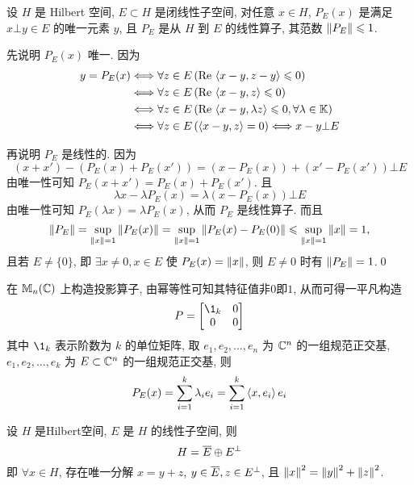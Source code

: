 		\begin{Theorem}[投影线性算子]
			 设 $ H $ 是 Hilbert 空间, $ E\subset H $ 是闭线性子空间,  对任意 $ x\in H $, $ P_{E}(x) $ 是满足 $ x\bot y\in E $ 的唯一元素 $ y $, 且 $ P_{E} $ 是从 $ H $ 到 $ E $ 的线性算子, 其范数 $ \norm{P_{E}}\leqslant1 $.
		\end{Theorem}
			
		\begin{Proof}
			先说明 $ P_{E}(x) $ 唯一. 因为
			\[
				\begin{aligned}
					y=P_{E}(x) & \Longleftrightarrow \forall z\in E\,(\Re\lrangle{x-y, z-y}\leqslant0)\\
					& \Longleftrightarrow \forall z\in E\,(\Re\lrangle{x-y, z}\leqslant0)\\
					& \Longleftrightarrow \forall z\in E\,(\Re\lrangle{x-y, \lambda z}\leqslant0, \forall \lambda\in \K)\\
					& \Longleftrightarrow \forall z\in E\,(\lrangle{x-y, z}=0)\Longleftrightarrow x-y\bot E
				\end{aligned}
			\]

			再说明 $ P_{E} $ 是线性的. 因为
			\[
				(x+x')-(P_{E}(x)+P_{E}(x'))=(x-P_{E}(x))+(x'-P_{E}(x'))\bot E
			\]
			由唯一性可知 $ P_{E}(x+x')=P_{E}(x)+P_{E}(x') $. 且
			\[
				\lambda x-\lambda P_{E}(x)=\lambda(x-P_{E}(x))\bot E
			\]
			由唯一性可知 $ P_{E}(\lambda x)=\lambda P_{E}(x) $, 从而 $ P_{E} $ 是线性算子. 而且
			\[
				\norm{P_{E}}=\sup_{\norm{x}=1}\norm{P_{E}(x)}=\sup_{\norm{x}=1}\norm{P_{E}(x)-P_{E}(0)}\leqslant\sup_{\norm{x}=1}\norm{x}=1,
			\]
			且若 $ E\ne \{ 0 \} $, 即 $ \exists x\ne 0, x\in E $ 使 $ P_{E}(x)=\norm{x} $, 则 $ E\ne 0 $ 时有 $ \norm{P_{E}}=1 $.\qed
		\end{Proof}
		 
		\begin{Example}
			在 $ \mathbb{M}_{n}(\C) $ 上构造投影算子, 由幂等性可知其特征值非$0$即$1$, 从而可得一平凡构造
			\[
				P=\begin{bmatrix}
					\1_{k} & 0 \\
					0 & 0
				\end{bmatrix}
			\]
			其中 $ \1_{k} $ 表示阶数为 $ k $ 的单位矩阵, 取 $ e_{1}, e_{2},\dots,e_{n} $ 为 $ \C^{n} $ 的一组规范正交基, $ e_{1}, e_{2},\dots,e_{k} $ 为 $ E\subset\C^{n} $ 的一组规范正交基, 则
			\[
				P_{E}(x)=\sum_{i=1}^{k}\lambda_{i}e_{i}=\sum_{i=1}^{k}\lrangle{x, e_{i}}e_{i}
			\]
		\end{Example}

	\begin{Corollary}[正交分解]
		设 $ H $ 是Hilbert空间, $ E $ 是 $ H $ 的线性子空间, 则
		\[
			H=\baro{E}\oplus E^{\bot}
		\]
		即 $ \forall x\in H $, 存在唯一分解 $ x=y+z $, $ y\in\baro{E}, z\in E^{\bot} $, 且 $ \norm{x}^{2}=\norm{y}^{2}+\norm{z}^{2} $.
	\end{Corollary}

